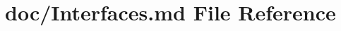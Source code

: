 \hypertarget{_interfaces_8md}{\section{doc/\-Interfaces.md File Reference}
\label{_interfaces_8md}
}
